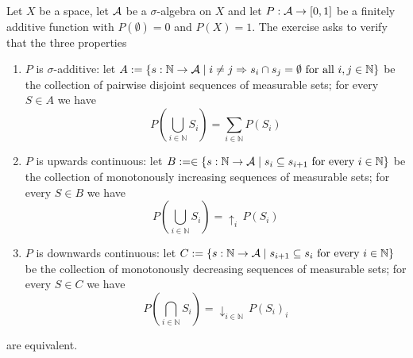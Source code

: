 \documentclass{article}
\begin{document}
\maketitle

\begin{ex}
\newcommand{\ulimsym}{{\uparrow}}
\newcommand{\ulim}[2]{\ulimsym_{#1\in\mathbb{N}}\,{#2}_{#1}}
\newcommand{\dlimsym}{{\downarrow}}
\newcommand{\dlim}[2]{\dlimsym_{#1\in\mathbb{N}}\,{#2}_{#1}}
Let $X$ be a space, let $\mathcal{A}$ be a $\sigma$-algebra on $X$ and
let $P:\mathcal{A}\to[0,1]$ be a finitely additive function with $P(\emptyset)=0$ and $P(X)=1$. The exercise asks to verify that the three properties
\begin{enumerate}
\item $P$ is $\sigma$-additive: let $A:=\{s:\mathbb{N}\to\mathcal{A}\mid i\neq j \Rightarrow s_i\cap s_j=\emptyset\text{ for all }i,j\in\mathbb{N}\}$ be the collection of pairwise disjoint sequences of measurable sets; for every $S\in A$ we have
\begin{equation*}
\textstyle
P(\bigcup_{i\in\mathbb{N}}S_i)=\sum_{i\in\mathbb{N}}P(S_i)
\end{equation*}
\item $P$ is upwards continuous: let $B:=\in\{s:\mathbb{N}\to\mathcal{A}\mid s_i\subseteq s_{i+1}\text{ for every }i\in\mathbb{N}\}$ be the collection of monotonously increasing sequences of measurable sets; for every $S\in B$ we have
\begin{equation*}
\textstyle
P(\bigcup_{i\in\mathbb{N}}S_i)=\ulimsym_{i}\,{P(S_i)}
\end{equation*}
\item $P$ is downwards continuous: let $C:=\{s:\mathbb{N}\to\mathcal{A}\mid s_{i+1}\subseteq s_i\text{ for every }i\in\mathbb{N}\}$ be the collection of monotonously decreasing sequences of measurable sets; for every $S\in C$ we have
\begin{equation*}
\textstyle
P(\bigcap_{i\in\mathbb{N}}S_i)=\dlim{i}{P(S_i)}
\end{equation*}
\end{enumerate}
are equivalent.


\end{ex}
\end{document}
